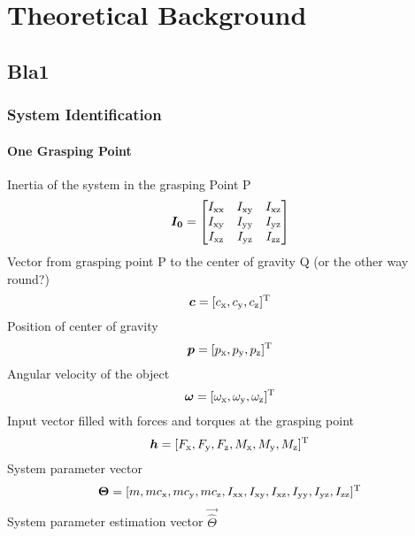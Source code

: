 

\chapter{Theoretical Background}

\section{Bla1}
\label{sec:bla1}
\lipsum[1] 

\subsection{System Identification}
\label{subsec:system_identification}

\subsubsection{One Grasping Point}
Inertia of the system in the grasping Point P
\begin{equation}
	\boldsymbol{I_0} = 
	\begin{bmatrix}	
		I_{\mathrm{xx}}	& I_{\mathrm{xy}}	& I_{\mathrm{xz}} \\
		I_{\mathrm{xy}}	& I_{\mathrm{yy}}	& I_{\mathrm{yz}} \\
		I_{\mathrm{xz}}	& I_{\mathrm{yz}}	& I_{\mathrm{zz}}
	\end{bmatrix}
\end{equation}
Vector from grasping point P to the center of gravity Q (or the other way round?)
\begin{equation}
	\boldsymbol{c} = [c_{\mathrm{x}}, c_{\mathrm{y}}, c_{\mathrm{z}}]^{\mathrm{T}}
\end{equation}
Position of center of gravity
\begin{equation}
	\boldsymbol{p} = [p_{\mathrm{x}}, p_{\mathrm{y}}, p_{\mathrm{z}}]^{\mathrm{T}}
\end{equation}
Angular velocity of the object
\begin{equation}
	\boldsymbol{\omega} = [\omega_{\mathrm{x}}, \omega_{\mathrm{y}}, \omega_{\mathrm{z}}]^{\mathrm{T}}
\end{equation}
Input vector filled with forces and torques at the grasping point
\begin{equation}
	\boldsymbol{h} = [F_{\mathrm{x}}, F_{\mathrm{y}}, F_{\mathrm{z}}, M_{\mathrm{x}}, M_{\mathrm{y}}, M_{\mathrm{z}}]^{\mathrm{T}}
\end{equation}
System parameter vector
\begin{equation}
	\boldsymbol{\Theta} = [m, m c_{\mathrm{x}}, m c_{\mathrm{y}}, m c_{\mathrm{z}}, I_{\mathrm{xx}}, I_{\mathrm{xy}}, I_{\mathrm{xz}}, I_{\mathrm{yy}},I_{\mathrm{yz}}, I_{\mathrm{zz}}]^{\mathrm{T}}
\end{equation}
System parameter estimation vector $\vec{\hat \Theta}$

